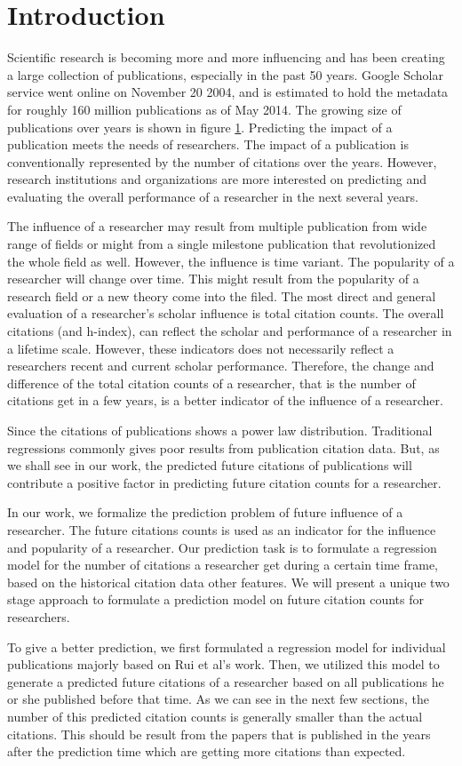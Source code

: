 \section{Introduction}
Scientific research is becoming more and more influencing and has been creating a large collection of publications, especially in the past 50 years.
Google Scholar service went online on November 20 2004, and is estimated to hold the metadata for roughly 160 million publications as of May 2014\cite{}.
The growing size of publications over years is shown in figure \ref{}.
Predicting the impact of a publication meets the needs of researchers. The impact of a publication is conventionally represented by the number of citations over the years.
However, research institutions and organizations are more interested on predicting and evaluating the overall performance of a researcher in the next several years.

The influence of a researcher may result from multiple publication from wide range of fields or might from a single milestone publication that revolutionized the whole field as well. However, the influence is time variant. The popularity of a researcher will change over time. This might result from the popularity of a research field or a new theory come into the filed.
The most direct and general evaluation of a researcher's scholar influence is total citation counts. The overall citations (and h-index), can reflect the scholar and performance of a researcher in a lifetime scale. However, these indicators does not necessarily reflect a researchers recent and current scholar performance. Therefore, the change and difference of the total citation counts of a researcher, that is the number of citations get in a few years, is a better indicator of the influence of a researcher.

Since the citations of publications shows a power law distribution. Traditional regressions commonly gives poor results from publication citation data\cite{cheng2014can,radicchi2008universality}. But, as we shall see in our work, the predicted future citations of publications will contribute a positive factor in predicting future citation counts for a researcher.

In our work, we formalize the prediction problem of future influence of a researcher. The future citations counts is used as an indicator for the influence and popularity of a researcher. Our prediction task is to formulate a regression model for the number of citations a researcher get during a certain time frame, based on the historical citation data other features. We will present a unique two stage approach to formulate a prediction model on future citation counts for researchers.

To give a better prediction, we first formulated a regression model for individual publications majorly based on Rui et al's work\cite{yan2011citation}. Then, we utilized this model to generate a predicted future citations of a researcher based on all publications he or she published before that time. As we can see in the next few sections, the number of this predicted citation counts is generally smaller than the actual citations. This should be result from the papers that is published in the years after the prediction time which are getting more citations than expected.
